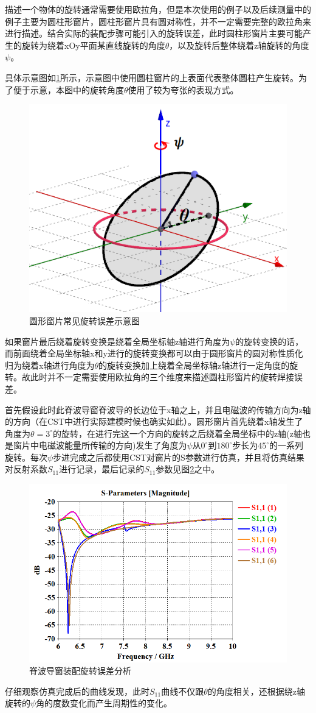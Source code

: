 \documentclass[master]{thesis-uestc}
\begin{document}
描述一个物体的旋转通常需要使用欧拉角，但是本次使用的例子以及后续测量中的例子主要为圆柱形窗片，圆柱形窗片具有圆对称性，并不一定需要完整的欧拉角来进行描述。结合实际的装配步骤可能引入的旋转误差，此时圆柱形窗片主要可能产生的旋转为绕着xOy平面某直线旋转的角度\(\theta\)，以及旋转后整体绕着z轴旋转的角度\(\psi\)。

具体示意图如\ref{fig:旋转示意图}所示，示意图中使用圆柱窗片的上表面代表整体圆柱产生旋转。为了便于示意，本图中的旋转角度\(\theta\)使用了较为夸张的表现方式。
\begin{figure}[!htb]
    \centering
    \includegraphics[width=0.25\linewidth]{pic/chapter5/窗片旋转角示意图.png}
    \caption{圆形窗片常见旋转误差示意图}
    \label{fig:旋转示意图}
\end{figure}
如果窗片最后绕着旋转变换是绕着全局坐标轴z轴进行角度为$\psi$的旋转变换的话，而前面绕着全局坐标轴x和y进行的旋转变换都可以由于圆形窗片的圆对称性质化归为绕着x轴进行角度为$\theta$的旋转变换加上绕着全局坐标轴z轴进行一定角度的旋转。故此时并不一定需要使用欧拉角的三个维度来描述圆柱形窗片的旋转焊接误差。

首先假设此时此脊波导窗脊波导的长边位于x轴之上，并且电磁波的传输方向为z轴的方向（在CST中进行实际建模时候也确实如此）。圆形窗片首先绕着x轴发生了角度为$\theta=3^ \circ $的旋转，在进行完这一个方向的旋转之后绕着全局坐标中的z轴(z轴也是窗片中电磁波能量所传输的方向)发生了角度为$\psi$从$0^ \circ$到$180^ \circ$步长为$45^ \circ$的一系列旋转。每次$\psi $步进完成之后都使用CST对窗片的S参数进行仿真，并且将仿真结果对反射系数$S_{11}$进行记录，最后记录的$S_{11}$参数见图\ref{fig:脊波导圆窗旋转}之中。
\begin{figure}[!htb]
    \centering
    \includegraphics[width=0.5\linewidth]{pic/chapter5/脊波导圆窗旋转.png}
    \caption{脊波导窗装配旋转误差分析}
    \label{fig:脊波导圆窗旋转}
\end{figure}
仔细观察仿真完成后的曲线发现，此时$S_{11}$曲线不仅跟\(\theta\)的角度相关，还根据绕z轴旋转的$\psi$角的度数变化而产生周期性的变化。
\end{document}
